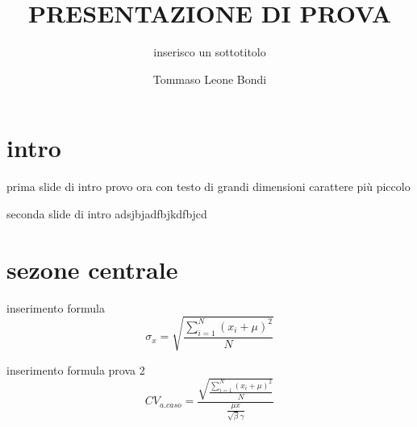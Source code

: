 \documentclass{beamer}
\title{PRESENTAZIONE DI PROVA}
\subtitle{inserisco un sottotitolo}
\author{Tommaso Leone Bondi}
\institute{UniBo-Alma Mater Studiorum\\
\bigskip %
\texttt{[image: logounibo.png]}
}
\begin{document}
\maketitle
\section{intro}
\begin{frame}{prima slide di intro}
\Huge provo ora con testo di grandi dimensioni
\tiny carattere più piccolo 
\end{frame}
\begin{frame}{seconda slide di intro}
 adsjbjadfbjkdfbjcd 
 
\end{frame}

 \section{sezone centrale}
 \begin{frame}{inserimento formula} %
 \begin{equation}
 \sigma_{x}= \sqrt{\frac{\sum_{i=1}^{N}({x_{i}+\mu})^{2}}{N}} 
 \end{equation}
 \end{frame}
 \begin{frame}{inserimento formula prova 2}
 \begin{equation}
 CV_{a.caso}=\frac {\sqrt{\frac{\sum_{i=1}^{N}({x_{i}+\mu})^{2}}{N}}}{\frac{\mu{x}}{\sqrt{\beta}\gamma}} 
 \end{equation}
 \end{frame}
\end{document}
